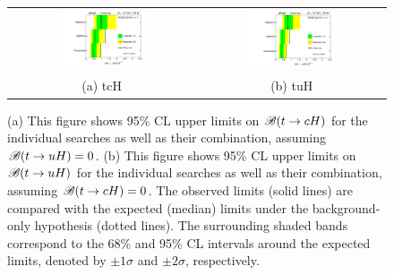 \begin{figure}[h!]
\begin{center}
\begin{tabular}{@{}cc@{}}
\includegraphics[width=0.49\textwidth]{figures/tcH_Limits.pdf}&
\includegraphics[width=0.49\textwidth]{figures/tuH_Limits.pdf}\\
(a) tcH & (b) tuH \\
\end{tabular}
\caption{\small {(a) This figure shows 95\% CL upper limits on $\mathscr{B}(t\to cH)$ for the individual searches as well as their
combination, assuming $\mathscr{B}(t\to uH)=0$. (b) This figure shows 95\% CL upper limits on $\mathscr{B}(t\to uH)$ for the individual searches as well as their
combination, assuming $\mathscr{B}(t\to cH)=0$. The observed limits (solid lines) are compared with the 
expected (median) limits under the background-only hypothesis (dotted lines). The surrounding shaded bands correspond to the 68\% and 95\% CL intervals around the expected limits, 
denoted by $\pm 1\sigma$ and $\pm 2\sigma$, respectively.
}}
\label{fig:limits_combo_1D_hc} 
\end{center}
\end{figure}


